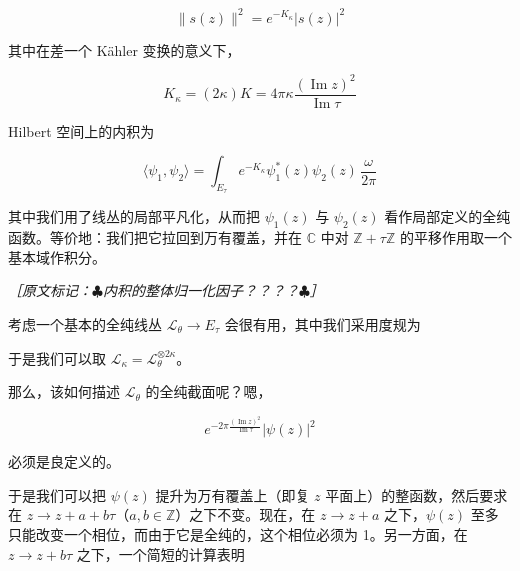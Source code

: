 \begin{equation}
  \|s(z)\|^2=e^{-K_\kappa}|s(z)|^2
  \tag{2.161}
  \label{eq:2.161}
\end{equation}

其中在差一个 Kähler 变换的意义下，

\begin{equation}
  K_\kappa=(2\kappa)K=4\pi\kappa\frac{(\operatorname{Im}z)^2}{\operatorname{Im}\tau}
  \tag{2.162}
  \label{eq:2.162}
\end{equation}

Hilbert 空间上的内积为

\begin{equation}
  \langle\psi_1,\psi_2\rangle
  =\int_{E_\tau}e^{-K_\kappa}\psi_1^*(z)\psi_2(z)\,\frac{\omega}{2\pi}
  \tag{2.163}
  \label{eq:2.163}
\end{equation}

其中我们用了线丛的局部平凡化，从而把 $\psi_1(z)$ 与 $\psi_2(z)$ 看作局部定义的全纯函数。等价地：我们把它拉回到万有覆盖，并在 $\mathbb{C}$ 中对 $\mathbb{Z}+\tau\mathbb{Z}$ 的平移作用取一个基本域作积分。

{\small\itshape ［原文标记：$\clubsuit$内积的整体归一化因子？？？？$\clubsuit$］}

考虑一个基本的全纯线丛 $\mathcal{L}_\theta\to E_\tau$ 会很有用，其中我们采用度规为

于是我们可以取 $\mathcal{L}_\kappa=\mathcal{L}_\theta^{\otimes 2\kappa}$。

那么，该如何描述 $\mathcal{L}_\theta$ 的全纯截面呢？嗯，

\begin{equation}
  e^{-2\pi\frac{(\operatorname{Im}z)^2}{\operatorname{Im}\tau}}|\psi(z)|^2
  \tag{2.164}
  \label{eq:2.164}
\end{equation}

必须是良定义的。

于是我们可以把 $\psi(z)$ 提升为万有覆盖上（即复 $z$ 平面上）的整函数，然后要求在 $z\to z+a+b\tau$（$a,b\in\mathbb{Z}$）之下不变。现在，在 $z\to z+a$ 之下，$\psi(z)$ 至多只能改变一个相位，而由于它是全纯的，这个相位必须为 1。另一方面，在 $z\to z+b\tau$ 之下，一个简短的计算表明

